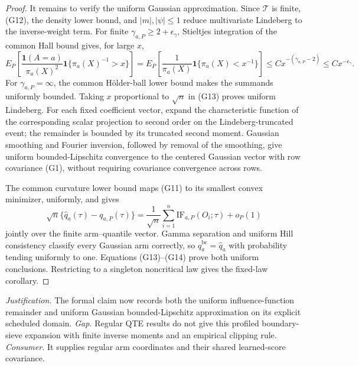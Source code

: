 \documentclass{article}
\begin{document}
\begin{proof}
It remains to verify the uniform Gaussian approximation.  Since \(\mathcal T\) is finite, (G12), the density lower bound, and \(|m|,|\psi|\le1\) reduce multivariate Lindeberg to the inverse-weight term.  For finite \(\gamma_{a,P}\ge2+\epsilon_\gamma\), Stieltjes integration of the common Hall bound gives, for large \(x\),
\[
E_P\!\left[\frac{\mathbf1(A=a)}{\pi_a(X)^2}
\mathbf1\{\pi_a(X)^{-1}>x\}\right]
=E_P\!\left[\frac1{\pi_a(X)}\mathbf1\{\pi_a(X)<x^{-1}\}\right]
\le Cx^{-(\gamma_{a,P}-2)}\le Cx^{-\epsilon_\gamma}.
\tag{G13}
\]
For \(\gamma_{a,P}=\infty\), the common Hölder-ball lower bound makes the summands uniformly bounded.  Taking \(x\) proportional to \(\sqrt n\) in (G13) proves uniform Lindeberg.  For each fixed coefficient vector, expand the characteristic function of the corresponding scalar projection to second order on the Lindeberg-truncated event; the remainder is bounded by its truncated second moment.  Gaussian smoothing and Fourier inversion, followed by removal of the smoothing, give uniform bounded-Lipschitz convergence to the centered Gaussian vector with row covariance (G1), without requiring covariance convergence across rows.

The common curvature lower bound maps (G11) to its smallest convex minimizer, uniformly, and gives
\[
\sqrt n\{\widehat q_a(\tau)-q_{a,P}(\tau)\}
=\frac1{\sqrt n}\sum_{i=1}^n\mathrm{IF}_{a,P}(O_i;\tau)+o_P(1)
\tag{G14}
\]
jointly over the finite arm--quantile vector.  Gamma separation and uniform Hill consistency classify every Gaussian arm correctly, so \(\widehat q_a^{\mathrm{bc}}=\widehat q_a\) with probability tending uniformly to one.  Equations (G13)--(G14) prove both uniform conclusions.  Restricting to a singleton noncritical law gives the fixed-law corollary.
\end{proof}
\par\smallskip\noindent \textit{Justification.} The formal claim now records both the uniform influence-function remainder and uniform Gaussian bounded-Lipschitz approximation on its explicit scheduled domain. \textit{Gap.} Regular QTE results do not give this profiled boundary-sieve expansion with finite inverse moments and an empirical clipping rule. \textit{Consumer.} It supplies regular arm coordinates and their shared learned-score covariance.
\end{document}
